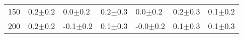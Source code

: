 \begin{tabular}{lllllll}
150 & {\cellcolor[HTML]{FDFDFD}} \color[HTML]{000000} 0.2$\pm$0.2 & {\cellcolor[HTML]{979797}} \color[HTML]{F1F1F1} 0.0$\pm$0.2 & {\cellcolor[HTML]{DDDDDD}} \color[HTML]{000000} 0.2$\pm$0.3 & {\cellcolor[HTML]{A3A3A3}} \color[HTML]{F1F1F1} 0.0$\pm$0.2 & {\cellcolor[HTML]{E8E8E8}} \color[HTML]{000000} 0.2$\pm$0.3 & {\cellcolor[HTML]{CDCDCD}} \color[HTML]{000000} 0.1$\pm$0.2 \\
200 & {\cellcolor[HTML]{EEEEEE}} \color[HTML]{000000} 0.2$\pm$0.2 & {\cellcolor[HTML]{C5C5C5}} \color[HTML]{000000} -0.1$\pm$0.2 & {\cellcolor[HTML]{BEBEBE}} \color[HTML]{000000} 0.1$\pm$0.3 & {\cellcolor[HTML]{AAAAAA}} \color[HTML]{F1F1F1} -0.0$\pm$0.2 & {\cellcolor[HTML]{BDBDBD}} \color[HTML]{000000} 0.1$\pm$0.3 & {\cellcolor[HTML]{ABABAB}} \color[HTML]{000000} 0.1$\pm$0.3 \\
\end{tabular}
